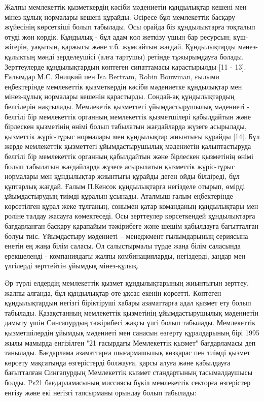 \begin{multicols}{2}
Жалпы мемлекеттік қызметкердің кәсіби мәдениетін құндылықтар кешені мен
мінез-құлық нормалары кешені құрайды. Әсіресе бұл мемлекеттік басқару
жүйесінің көрсеткіші болып табылады. Осы орайда біз құндылықтарға
тоқталып өтуді жөн көрдік. Құндылық - бұл адам қол жеткізу үшын бар
ресурсын; күш-жігерін, уақытын, қаржысы және т.б. жұмсайтын жағдай.
Құндылықтарды мәнез-құлықтың мәнді зерделеушісі (алға тартушы) ретінде
тұжырымдауға болады. Зерттеулерде құндылықтардың көптеген сипаттамасы
қарастырылды {[}11 - 13{]}. Ғалымдар М.С. Яницкий пен Isa Bertram, Robin
Bouwman, ғылыми еңбектерінде мемлекеттік қызметкердің кәсіби мәдениетке
құндылықтар мен мінез-құлық нормалары кешенін қарастырды. Сондай-ақ
құндылықтардың белгілерін нақтылады. Мемлекетік қызметтегі
ұйымдастырушылық мәдениеті - белгілі бір мемлекеттік органның
мемлекеттік қызметшілері қабылдайтын және бірлескен қызметінің өнімі
болып табылатын жағдайларда жүзеге асырылады, қызметтік жүріс-тұрыс
нормалары мен құндылықтар жиынтығы құрайды {[}14{]}. Бұл жерде
мемлекеттік қызметтегі ұйымдастырушылық мәдениетін қалыптастыруда
белгілі бір мемлекеттік органның қабылдайтын және бірлескен қызметінің
өнімі болып табылатын жағдайларда жүзеге асырылатын қызметтік
жүріс-тұрыс нормалары мен құндылықтар жиынтығы құрайды деген ойды
білдіреді, бұл құптарлық жағдай. Ғалым П.Кенсок құндылықтарға негізделе
отырып, өмірді ұйымдастырудың тиімді құралын ұсынады. Аталмыш ғалым
еңбектерінде көрсетілген құрал жеке тұлғаның, сонымен қатар команданың
құндылықтары мен роліне талдау жасауға көмектеседі. Осы зерттеулер
көрсеткендей құндылықтарға бағдарланған басқару қарапайым тәжірибеге
және шешім қабылдауға бағытталған болуы тиіс. Ұйымдастыру мәдениеті --
менеджмент ғылымдарының сериясына енетін ең жаңа білім саласы. Ол
салыстырмалы түрде жаңа білім саласында ерекшеленді - компаниядағы жалпы
комбинацияларды, негіздерді, заңдар мен үлгілерді зерттейтін ұйымдық
мінез-құлық.

Әр түрлі елдердің мемлекеттік қызмет құндылықтарының жиынтығын зерттеу,
жалпы алғанда, бұл құндылықтар өте ұқсас екенін көрсетті. Көптеген
құндылықтардың негізгі біріктіруші хабары азаматтарға адал қызмет ету
болып табылады. Қазақстанның мемлекеттік қызметінің ұйымдастырушылық
мәдениетін дамыту үшін Сингапурдың тәжірибесі жақсы үлгі болып табылады.
Мемлекеттік қызметшілердің ұйымдық мәдениеті мен санасын өзгерту
құралдарының бірі 1995 жылы мамырда енгізілген "21 ғасырдағы Мемлекеттік
қызмет" бағдарламасы деп танылады. Бағдарлама азаматтарға шығармашылық
көзқарас пен тиімді қызмет көрсету мақсатында өзгерістерді болжауға,
қарсы алуға және қабылдауға бағытталған Сингапурдың Мемлекеттік қызмет
стандартының тасымалдаушысы болды. Ps21 бағдарламасының миссиясы бүкіл
мемлекеттік секторға өзгерістер енгізу және екі негізгі тапсырманы
орындау болып табылады:


\end{multicols}
